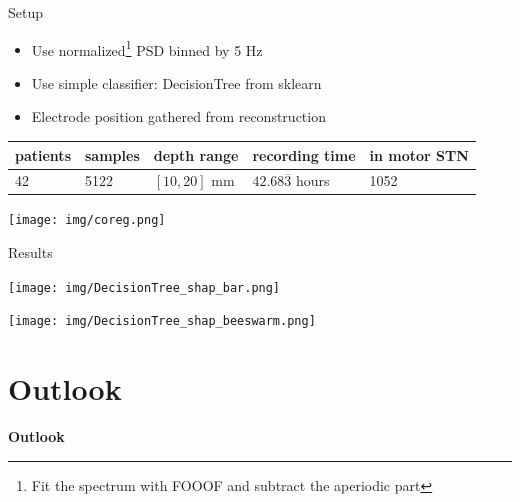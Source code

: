 \documentclass[10pt]{beamer}
\begin{document}
\begin{frame}{Setup}
\begin{itemize}
 \item Use normalized\footnote[frame]{Fit the spectrum with FOOOF and subtract the aperiodic part} PSD binned by 5 Hz \\ [1em]
 \item Use simple classifier: DecisionTree from sklearn\\ [1em]
 \item Electrode position gathered from reconstruction\\ [3em]
\end{itemize}
\begin{tabular}{l l l l l} \toprule
patients & samples & depth range & recording time & in motor STN \\ \midrule
42 & 5122 & $[10, 20]$ mm & $42.68\overline{3}$ hours & 1052 \\
\bottomrule
\end{tabular}
\framebreak
  \begin{center}
  \texttt{[image: img/coreg.png]}
    \end{center}
    \framebreak

\end{frame}
\begin{frame}{Results}
  \begin{center}
  \texttt{[image: img/DecisionTree\_shap\_bar.png]}
    \end{center}
    \framebreak

  \begin{center}
  \texttt{[image: img/DecisionTree\_shap\_beeswarm.png]}
    \end{center}
\end{frame}



\section{Outlook}
\begin{frame}
\begin{center}
 \begin{Huge}
  \textbf{Outlook}
 \end{Huge}
 \end{center}
\end{frame}
\end{document}
